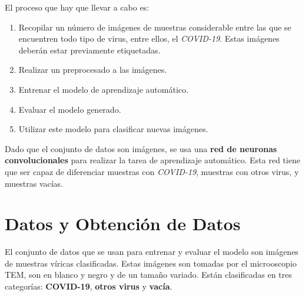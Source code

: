 \documentclass{uc3mpracticas}
\begin{document}
  El proceso que hay que llevar a cabo es:

  \begin{enumerate}
    \item Recopilar un número de imágenes de muestras considerable entre las que se encuentren todo tipo de virus, entre ellos, el \textit{COVID-19}. Estas imágenes deberán estar previamente etiquetadas.
    \item Realizar un preprocesado a las imágenes.
    \item Entrenar el modelo de aprendizaje automático.
    \item Evaluar el modelo generado.
    \item Utilizar este modelo para clasificar nuevas imágenes.
  \end{enumerate}

  \vspace{2mm}

  Dado que el conjunto de datos son imágenes, se usa una \textbf{red de neuronas convolucionales} para realizar la tarea de aprendizaje automático. Esta red tiene que ser capaz de diferenciar muestras con \textit{COVID-19}, muestras con otros virus, y muestras vacías.


  \section{Datos y Obtención de Datos}

  El conjunto de datos que se usan para entrenar y evaluar el modelo son imágenes de muestras víricas clasificadas. Estas imágenes son tomadas por el microoscopio TEM, son en blanco y negro y de un tamaño variado. Están clasificadas en tres categorías: \textbf{COVID-19}, \textbf{otros virus} y \textbf{vacía}.

  \vspace{5mm}
\end{document}
